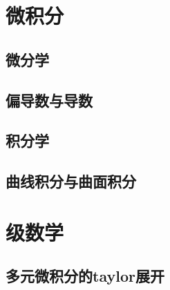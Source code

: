 \section{微积分}

\subsection{微分学}

\subsection{偏导数与导数}


\subsection{积分学}

\subsection{曲线积分与曲面积分}

\section{级数学}

\subsection{多元微积分的taylor展开}